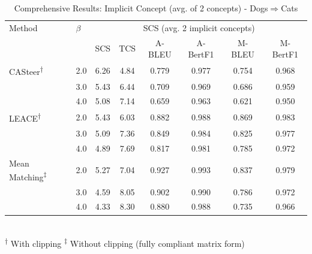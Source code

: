\begin{table}[htbp]
\centering
\caption{Comprehensive Results: Implicit Concept (avg. of 2 concepts) - Dogs$\Rightarrow$Cats}
\label{tab:implicitconcept_domesticated_canine_dogstocats_avg2}
\begin{tabular}{l|l|cccccc|}
\hline
Method & $\beta$ & \multicolumn{6}{c|}{SCS (avg. 2 implicit concepts)} \\
 &  & SCS & TCS & A-BLEU & A-BertF1 & M-BLEU & M-BertF1 \\
\hline
CASteer\textsuperscript{†} & 2.0 & 6.26 & 4.84 & 0.779 & 0.977 & 0.754 & 0.968 \\
 & 3.0 & 5.43 & 6.44 & 0.709 & 0.969 & 0.686 & 0.959 \\
 & 4.0 & 5.08 & 7.14 & 0.659 & 0.963 & 0.621 & 0.950 \\
\hline
LEACE\textsuperscript{†} & 2.0 & 5.43 & 6.03 & 0.882 & 0.988 & 0.869 & 0.983 \\
 & 3.0 & 5.09 & 7.36 & 0.849 & 0.984 & 0.825 & 0.977 \\
 & 4.0 & 4.89 & 7.69 & 0.817 & 0.981 & 0.785 & 0.972 \\
\hline
Mean Matching\textsuperscript{‡} & 2.0 & 5.27 & 7.04 & 0.927 & 0.993 & 0.837 & 0.979 \\
 & 3.0 & 4.59 & 8.05 & 0.902 & 0.990 & 0.786 & 0.972 \\
 & 4.0 & 4.33 & 8.30 & 0.880 & 0.988 & 0.735 & 0.966 \\
\hline
\end{tabular}
\\[0.5em]
\footnotesize
\textsuperscript{†} With clipping \quad \textsuperscript{‡} Without clipping (fully compliant matrix form)
\end{table}